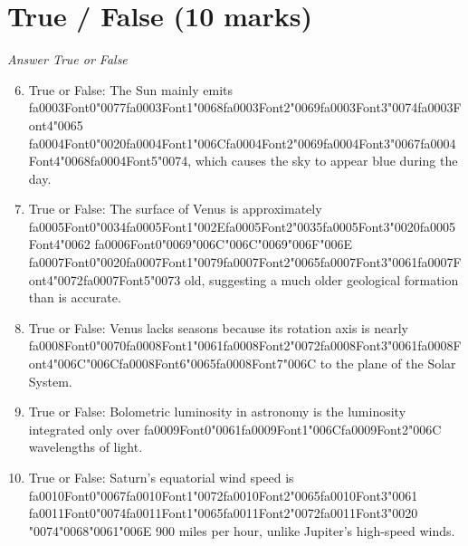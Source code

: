 \documentclass[12pt]{article}
\begin{document}
\section*{True / False (10 marks)}
\textit{Answer True or False}
\begin{enumerate}[label=\arabic*.]
\setcounter{enumi}{5}
\item True or False: The Sun mainly emits {\csname fa0003Font0\endcsname\char"0077}{\csname fa0003Font1\endcsname\char"0068}{\csname fa0003Font2\endcsname\char"0069}{\csname fa0003Font3\endcsname\char"0074}{\csname fa0003Font4\endcsname\char"0065} {\csname fa0004Font0\endcsname\char"0020}{\csname fa0004Font1\endcsname\char"006C}{\csname fa0004Font2\endcsname\char"0069}{\csname fa0004Font3\endcsname\char"0067}{\csname fa0004Font4\endcsname\char"0068}{\csname fa0004Font5\endcsname\char"0074}, which causes the sky to appear blue during the day.
\item True or False: The surface of Venus is approximately {\csname fa0005Font0\endcsname\char"0034}{\csname fa0005Font1\endcsname\char"002E}{\csname fa0005Font2\endcsname\char"0035}{\csname fa0005Font3\endcsname\char"0020}{\csname fa0005Font4\endcsname\char"0062} {\csname fa0006Font0\endcsname\char"0069}{\char"006C}{\char"006C}{\char"0069}{\char"006F}{\char"006E} {\csname fa0007Font0\endcsname\char"0020}{\csname fa0007Font1\endcsname\char"0079}{\csname fa0007Font2\endcsname\char"0065}{\csname fa0007Font3\endcsname\char"0061}{\csname fa0007Font4\endcsname\char"0072}{\csname fa0007Font5\endcsname\char"0073} old, suggesting a much older geological formation than is accurate.
\item True or False: Venus lacks seasons because its rotation axis is nearly {\csname fa0008Font0\endcsname\char"0070}{\csname fa0008Font1\endcsname\char"0061}{\csname fa0008Font2\endcsname\char"0072}{\csname fa0008Font3\endcsname\char"0061}{\csname fa0008Font4\endcsname\char"006C}{\char"006C}{\csname fa0008Font6\endcsname\char"0065}{\csname fa0008Font7\endcsname\char"006C} to the plane of the Solar System.
\item True or False: Bolometric luminosity in astronomy is the luminosity integrated only over {\csname fa0009Font0\endcsname\char"0061}{\csname fa0009Font1\endcsname\char"006C}{\csname fa0009Font2\endcsname\char"006C} wavelengths of light.
\item True or False: Saturn's equatorial wind speed is {\csname fa0010Font0\endcsname\char"0067}{\csname fa0010Font1\endcsname\char"0072}{\csname fa0010Font2\endcsname\char"0065}{\csname fa0010Font3\endcsname\char"0061} {\csname fa0011Font0\endcsname\char"0074}{\csname fa0011Font1\endcsname\char"0065}{\csname fa0011Font2\endcsname\char"0072}{\csname fa0011Font3\endcsname\char"0020} {\char"0074}{\char"0068}{\char"0061}{\char"006E} 900 miles per hour, unlike Jupiter's high-speed winds.
\end{enumerate}
\end{document}
